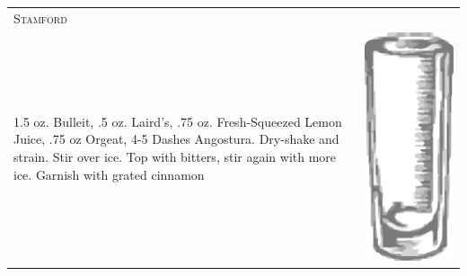 \documentclass{article}
\begin{document}
\begin{multicols}{2}
\begin{tabular}{p{2in} p{0.5in}}
\multicolumn{2}{p{3in}}{\centering\Huge\textsc{Stamford}} \\ 
  \vspace{-0.1in}1.5 oz. Bulleit, .5 oz. Laird's, .75 oz.  Fresh-Squeezed Lemon Juice, .75 oz Orgeat, 4-5 Dashes Angostura. Dry-shake and strain. Stir over ice. Top with bitters, stir again with more ice. Garnish with grated cinnamon &
  \vspace{-0.1in} \includegraphics{collins.png}
\end{tabular}


\end{multicols}
\end{document}
